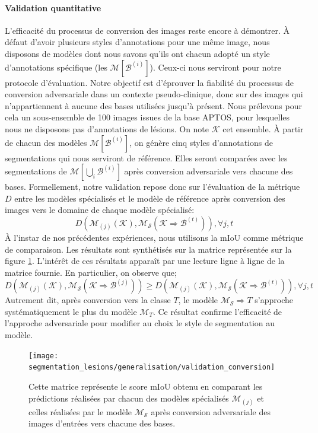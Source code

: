 \paragraph{Validation quantitative}

L'efficacité du processus de conversion des images reste encore à démontrer. À défaut d'avoir plusieurs styles d'annotations pour une même image, nous disposons de modèles dont nous savons qu'ils ont chacun adopté un style d'annotations spécifique (les $\mathcal{M}[\mathcal{B}^{(i)}]$). Ceux-ci nous serviront pour notre protocole d'évaluation. Notre objectif est d'éprouver la fiabilité du processus de conversion adversariale dans un contexte pseudo-clinique, donc sur des images qui n'appartiennent à aucune des bases utilisées jusqu'à présent. Nous prélevons pour cela un sous-ensemble de 100 images issues de la base APTOS, pour lesquelles nous ne disposons pas d'annotations de lésions. On note $\mathcal{K}$ cet ensemble. À partir de chacun des modèles $\mathcal{M}[\mathcal{B}^{(i)}]$, on génère cinq styles d'annotations de segmentations qui nous serviront de référence. Elles seront comparées avec les segmentations de $\mathcal{M}[\bigcup_i \mathcal{B}^{(i)}]$ après conversion adversariale vers chacune des bases. Formellement, notre validation repose donc sur l'évaluation de la métrique $D$ entre les modèles spécialisés et le modèle de référence après conversion des images vers le domaine de chaque modèle spécialisé:
\begin{equation}
	D(\mathcal{M}_{(j)}(\mathcal{K}), \mathcal{M}_\mathcal{S}(\mathcal{K} \Rightarrow \mathcal{B}^{(t)})), \forall j, t
\end{equation}
À l'instar de nos précédentes expériences, nous utilisons la mIoU comme métrique de comparaison. Les résultats sont synthétisés sur la matrice représentée sur la figure \ref{fig:ValidationConversionTable}. L'intérêt de ces résultats apparaît par une lecture ligne à ligne de la matrice fournie. En particulier, on observe que;
\begin{equation}
	D(\mathcal{M}_{(j)}(\mathcal{K}), \mathcal{M}_\mathcal{S}(\mathcal{K} \Rightarrow \mathcal{B}^{(j)})) \geq D(\mathcal{M}_{(j)}(\mathcal{K}), \mathcal{M}_\mathcal{S}(\mathcal{K} \Rightarrow \mathcal{B}^{(t)})), \forall j, t
\end{equation}
Autrement dit, après conversion vers la classe $T$, le modèle $\mathcal{M}_\mathcal{S} \Rightarrow T$ s'approche systématiquement le plus du modèle $\mathcal{M}_T$. Ce résultat confirme l'efficacité de l'approche adversariale pour modifier au choix le style de segmentation au modèle. 
\begin{figure}
	\centering
	\texttt{[image: segmentation\_lesions/generalisation/validation\_conversion]}
	\caption{Cette matrice représente le score mIoU obtenu en comparant les prédictions réalisées par chacun des modèles spécialisés $\mathcal{M}_{(j)}$ et celles réalisées par le modèle $\mathcal{M}_\mathcal{S}$ après conversion adversariale des images d'entrées vers chacune des bases.}
	\label{fig:ValidationConversionTable}
\end{figure}



